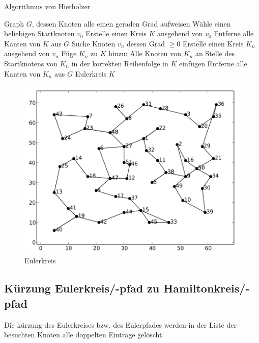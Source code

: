 \documentclass[11pt,a4paper]{article}
\begin{document}
\begin{algorithm}[H]
    \renewcommand{\algorithmicrequire}{\textbf{Eingabe:}}
    \renewcommand{\algorithmicensure}{\textbf{Ausgabe:}}
    \caption{Algorithmus von Hierholzer}

    \begin{algorithmic}[1]
    \REQUIRE Graph $G$, dessen Knoten alle einen geraden Grad aufweisen
        \STATE Wähle einen beliebigen Startknoten $v_0$
        \STATE Erstelle einen Kreis $K$ ausgehend von $v_0$
        \STATE Entferne alle Kanten von $K$ aus $G$
            \STATE Suche Knoten $v_n$ dessen Grad $\ge 0$
            \STATE Erstelle einen Kreis $K_n$ ausgehend von $v_n$
            \STATE Füge $K_n$ zu $K$ hinzu: Alle Knoten von $K_n$ an Stelle des Startknotens von $K_n$ in der korrekten Reihenfolge in $K$ einfügen
            \STATE Entferne alle Kanten von $K_n$ aus $G$
        \ENDWHILE
    \ENSURE Eulerkreis $K$
    \end{algorithmic}
\end{algorithm}

\begin{figure}[H]
        \centering
        \includegraphics[width=14cm]{gfx/eil51_euler}
        \caption{Eulerkreis}
        \label{img:eil51_euler}
\end{figure}



\subsection{Kürzung Eulerkreis/-pfad zu Hamiltonkreis/-pfad}
Die kürzung des Eulerkreises bzw. des Eulerpfades werden in der Liste der besuchten Knoten alle doppelten Einträge gelöscht.
\end{document}
